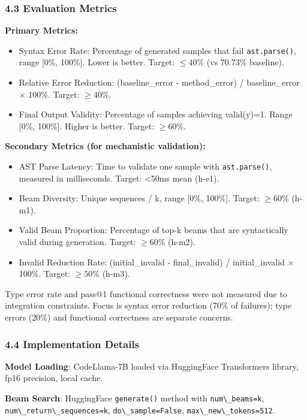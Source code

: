 \subsubsection{4.3 Evaluation Metrics}

\textbf{Primary Metrics:}
\begin{itemize}
\item Syntax Error Rate: Percentage of generated samples that fail \texttt{ast.parse()}, range [0\%, 100\%]. Lower is better. Target: $\leq 40$\% (vs 70.73\% baseline).
\item Relative Error Reduction: (baseline\_error - method\_error) / baseline\_error $\times$ 100\%. Target: $\geq 40$\%.
\item Final Output Validity: Percentage of samples achieving valid(y)=1. Range [0\%, 100\%]. Higher is better. Target: $\geq 60$\%.
\end{itemize}

\textbf{Secondary Metrics (for mechanistic validation):}
\begin{itemize}
\item AST Parse Latency: Time to validate one sample with \texttt{ast.parse()}, measured in milliseconds. Target: <50ms mean (h-e1).
\item Beam Diversity: Unique sequences / k, range [0\%, 100\%]. Target: $\geq 60$\% (h-m1).
\item Valid Beam Proportion: Percentage of top-k beams that are syntactically valid during generation. Target: $\geq 60$\% (h-m2).
\item Invalid Reduction Rate: (initial\_invalid - final\_invalid) / initial\_invalid $\times$ 100\%. Target: $\geq 50$\% (h-m3).
\end{itemize}

Type error rate and pass@1 functional correctness were not measured due to integration constraints. Focus is syntax error reduction (70\% of failures); type errors (20\%) and functional correctness are separate concerns.

\subsubsection{4.4 Implementation Details}

\textbf{Model Loading}: CodeLlama-7B loaded via HuggingFace Transformers library, fp16 precision, local cache.

\textbf{Beam Search}: HuggingFace \texttt{generate()} method with \texttt{num\textbackslash \_beams=k}, \texttt{num\textbackslash \_return\textbackslash \_sequences=k}, \texttt{do\textbackslash \_sample=False}, \texttt{max\textbackslash \_new\textbackslash \_tokens=512}.


